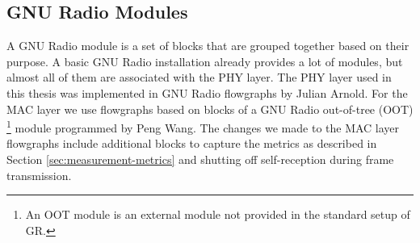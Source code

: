 \subsection{GNU Radio Modules}
A GNU Radio module is a set of blocks that are grouped together based on their purpose. A basic GNU Radio installation already provides a lot of modules, but almost all of them are associated with the PHY layer. The PHY layer used in this thesis was implemented in GNU Radio flowgraphs by Julian Arnold. For the MAC layer we use flowgraphs based on blocks of a GNU Radio out-of-tree (OOT) \footnote{An OOT module is an external module not provided in the standard setup of GR.} module programmed by Peng Wang. The changes we made to the MAC layer flowgraphs include additional blocks to capture the metrics as described in Section \ref{sec:measurement-metrics} and shutting off self-reception during frame transmission. 
